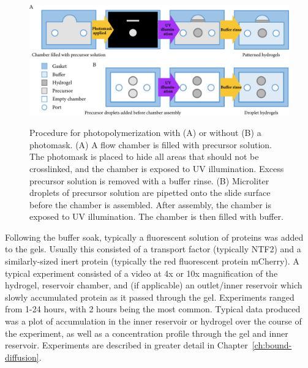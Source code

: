 \begin{figure}
\caption{Procedure for photopolymerization with (A) or without (B) a photomask. (A) A flow chamber is filled with precursor solution.  The photomask is placed to hide all areas that should not be crosslinked, and the chamber is exposed to UV illumination.  Excess precursor solution is removed with a buffer rinse. (B) Microliter droplets of precursor solution are pipetted onto the slide surface before the chamber is assembled.  After assembly, the chamber is exposed to UV illumination.  The chamber is then filled with buffer.}
\centering
\includegraphics[width=\textwidth]{figs/ch03/photomask}
\label{fig:photomask}
\end{figure}

Following the buffer soak, typically a fluorescent solution of proteins was added to the gels.  Usually this consisted of a transport factor (typically NTF2) and a similarly-sized inert protein (typically the red fluorescent protein mCherry).  A typical experiment consisted of a video at 4x or 10x magnification of the hydrogel, reservoir chamber, and (if applicable) an outlet/inner reservoir which slowly accumulated protein as it passed through the gel.  Experiments ranged from 1-24 hours, with 2 hours being the most common.  Typical data produced was a plot of accumulation in the inner reservoir or hydrogel over the course of the experiment, as well as a concentration profile through the gel and inner reservoir.  Experiments are described in greater detail in Chapter~\ref{ch:bound-diffusion}.



